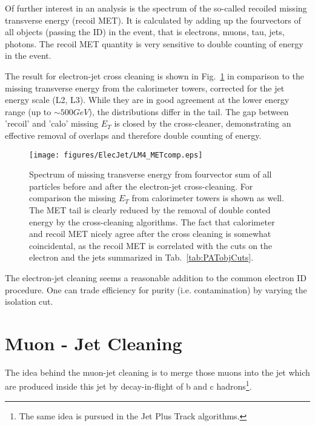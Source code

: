 \documentclass{cmspaper}
\begin{document}
Of further interest in an analysis is the spectrum of the so-called recoiled
missing transverse energy (recoil MET). It is calculated by adding up the
fourvectors of all objects (passing the ID) in the event, that is electrons,
muons, tau, jets, photons. The recoil MET quantity is very sensitive to
double counting of energy in the event.

The result for electron-jet cross cleaning is shown in Fig.~\ref{fig:met_ElecJet} in comparison to the missing transverse energy from the
calorimeter towers, corrected for the jet energy scale (L2, L3). While they are
in good agreement at the lower energy range (up to \(\sim 500 GeV\)), the
distributions differ in the tail. The gap between 'recoil' and 'calo' missing
$E_T$ is closed by the cross-cleaner, demonstrating an effective removal of
overlaps and therefore double counting of energy.

\begin{figure}[htb]
\begin{center}
    \texttt{[image: figures/ElecJet/LM4\_METcomp.eps]}
    \caption{Spectrum of missing transverse energy from fourvector sum of all
    particles before and after the electron-jet cross-cleaning. For comparison
    the missing $E_T$ from calorimeter towers is shown as well. The MET tail is
    clearly reduced by the removal of double conted energy by the cross-cleaning
    algorithms. The fact that calorimeter and recoil MET nicely agree after the
    cross cleaning is somewhat coincidental, as the recoil MET is correlated
    with the cuts on the electron and the jets summarized in Tab.~\ref{tab:PATobjCuts}.}
\label{fig:met_ElecJet}
\end{center}
\end{figure}
The electron-jet cleaning seems a reasonable addition to the common
electron ID procedure. One can trade efficiency for purity (i.e. contamination)
by varying the isolation cut.

\clearpage


\section{Muon - Jet Cleaning}
The idea behind the muon-jet cleaning is to merge those muons into the jet which
are produced inside this jet by decay-in-flight of b and c hadrons\footnote{The
same idea is pursued in the Jet Plus Track algorithms.}.
\end{document}
